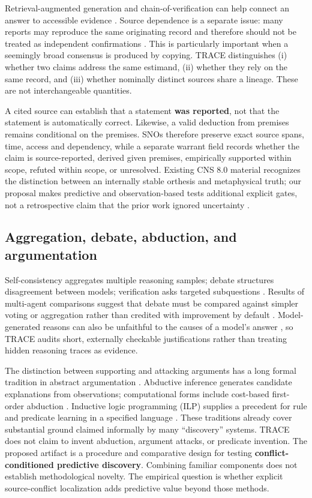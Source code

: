 \documentclass[11pt,a4paper]{article}
\begin{document}
Retrieval-augmented generation and chain-of-verification can help
connect an answer to accessible evidence \citep{R11, R16}. Source
dependence is a separate issue: many reports may reproduce the same
originating record and therefore should not be treated as independent
confirmations \citep{R10}. This is particularly important when a
seemingly broad consensus is produced by copying. TRACE distinguishes
(i) whether two claims address the same estimand, (ii) whether they rely
on the same record, and (iii) whether nominally distinct sources share a
lineage. These are not interchangeable quantities.

A cited source can establish that a statement \textbf{was reported}, not
that the statement is automatically correct. Likewise, a valid deduction
from premises remains conditional on the premises. SNOs therefore
preserve exact source spans, time, access and dependency, while a
separate warrant field records whether the claim is source-reported,
derived given premises, empirically supported within scope, refuted
within scope, or unresolved. Existing CNS 8.0 material recognizes the
distinction between an internally stable orthesis and metaphysical
truth; our proposal makes predictive and observation-based tests
additional explicit gates, not a retrospective claim that the prior work
ignored uncertainty \citep{G02, G03, G08}.

\subsection{Aggregation, debate, abduction, and
argumentation}\label{aggregation-debate-abduction-and-argumentation}

Self-consistency aggregates multiple reasoning samples; debate
structures disagreement between models; verification asks targeted
subquestions \citep{R12, R13, R16}. Results of multi-agent comparisons
suggest that debate must be compared against simpler voting or
aggregation rather than credited with improvement by default
\citep{R14}. Model-generated reasons can also be unfaithful to the
causes of a model's answer \citep{R18}, so TRACE audits short,
externally checkable justifications rather than treating hidden
reasoning traces as evidence.

The distinction between supporting and attacking arguments has a long
formal tradition in abstract argumentation \citep{R32}. Abductive
inference generates candidate explanations from observations;
computational forms include cost-based first-order abduction
\citep{R33}. Inductive logic programming (ILP) supplies a precedent for
rule and predicate learning in a specified language \citep{R21}. These
traditions already cover substantial ground claimed informally by many
``discovery'' systems. TRACE does not claim to invent abduction,
argument attacks, or predicate invention. The proposed artifact is a
procedure and comparative design for testing
\textbf{conflict-conditioned predictive discovery}. Combining familiar
components does not establish methodological novelty. The empirical
question is whether explicit source-conflict localization adds
predictive value beyond those methods.
\end{document}
